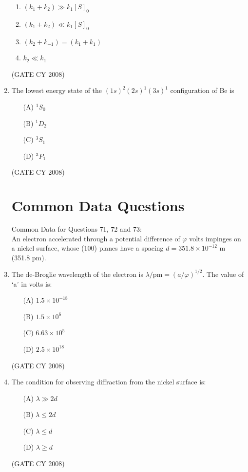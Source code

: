 \documentclass[12pt]{article}
\begin{document}
\begin{enumerate}
\begin{enumerate}
\item  \quad $(k_1 + k_2) \gg k_1 [S]_0$
\item  \quad $(k_1 + k_2) \ll k_1 [S]_0$ 
\item  \quad $(k_2 + k_{-1}) = (k_1 + k_1)$ 
\item  \quad $k_2 \ll k_1$
\end{enumerate}    \hfill{(GATE CY 2008)}


\item The lowest energy state of the $(1s)^2(2s)^1(3s)^1$ configuration of Be is

\begin{enumerate}
\item[(A)] $^1S_0$
\item[(B)] $^1D_2$
\item[(C)] $^3S_1$
\item[(D)] $^3P_1$
\end{enumerate}    \hfill{(GATE CY 2008)}



\section*{Common Data Questions}

{Common Data for Questions 71, 72 and 73:} \\
An electron accelerated through a potential difference of $\varphi$ volts impinges on a nickel surface, whose (100) planes have a spacing $d = 351.8 \times 10^{-12}$ m (351.8 pm).


    \item The de-Broglie wavelength of the electron is $\lambda/\text{pm} = (a/\varphi)^{1/2}$. The value of ‘a’ in volts is:
    \begin{enumerate}
        \item[(A)] $1.5 \times 10^{-18}$
        \item[(B)] $1.5 \times 10^6$
        \item[(C)] $6.63 \times 10^5$
        \item[(D)] $2.5 \times 10^{18}$
    \end{enumerate}    \hfill{(GATE CY 2008)}


    \item The condition for observing diffraction from the nickel surface is:
    \begin{enumerate}
        \item[(A)] $\lambda \gg 2d$
        \item[(B)] $\lambda \leq 2d$
        \item[(C)] $\lambda \leq d$
        \item[(D)] $\lambda \geq d$
    \end{enumerate}    \hfill{(GATE CY 2008)}



\end{enumerate}
\end{document}
